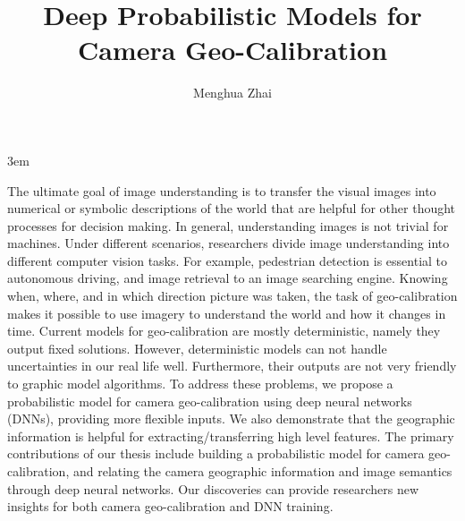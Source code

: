 \documentclass[final]{ukthesis}
\begin{document}
\emergencystretch 3em

\author{Menghua Zhai}
\title{Deep Probabilistic Models for Camera Geo-Calibration}

\abstract
{ \SingleSpacing
The ultimate goal of image understanding is to transfer the visual
images into numerical or symbolic descriptions of the world
that are helpful for other thought processes for decision making.
In general, understanding images is not trivial for machines.
Under different scenarios, researchers divide image
understanding into different computer vision tasks. For example,
pedestrian detection is essential to autonomous driving, and image
retrieval to an image searching engine. Knowing when, where, and in
which direction picture was taken, the task of geo-calibration makes
it possible to use imagery to understand the world and how it changes
in time. Current models for geo-calibration are mostly deterministic,
namely they output fixed solutions. However, deterministic 
models can not handle uncertainties in our real life well.
Furthermore, their outputs are not very friendly to graphic model
algorithms. To address these problems, we propose a probabilistic
model for camera geo-calibration using deep neural networks (DNNs),
providing more flexible inputs. We also demonstrate that the
geographic information is helpful for extracting/transferring high
level features. The primary contributions of our thesis include
building a probabilistic model for camera geo-calibration, and
relating the camera geographic information and image semantics through
deep neural networks. Our discoveries can provide researchers new
insights for both camera geo-calibration and DNN training.
}


\frontmatter
\maketitle



\tableofcontents\clearpage

\mainmatter




\backmatter




\end{document}
